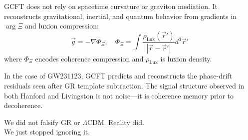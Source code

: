 \vspace{0.4em}
\noindent GCFT does not rely on spacetime curvature or graviton mediation. It reconstructs gravitational, inertial, and quantum behavior from gradients in $\arg\Xi$ and luxion compression:
\begin{equation}
\vec{g} = -\nabla \Phi_{\Xi}, \quad \Phi_{\Xi} = \int \frac{\rho_{\text{Lux}}(\vec{r}')}{|\vec{r} - \vec{r}'|} d^3\vec{r}'
\end{equation}
where $\Phi_{\Xi}$ encodes coherence compression and $\rho_{\text{Lux}}$ is luxion density.

\noindent In the case of GW231123, GCFT predicts and reconstructs the phase-drift residuals seen after GR template subtraction. The signal structure observed in both Hanford and Livingston is not noise—it is coherence memory prior to decoherence.

\vspace{0.4em}
\begin{center}
We did not falsify GR or $\Lambda$CDM. Reality did.\\
We just stopped ignoring it.
\end{center}
